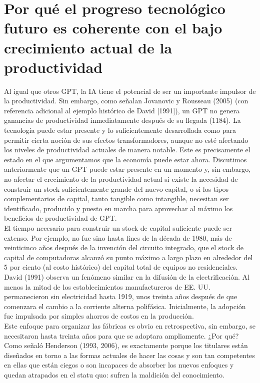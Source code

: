 \section{Por qué el progreso tecnológico futuro es coherente con el bajo crecimiento actual de la productividad}
Al igual que otros GPT, la IA tiene el potencial de ser un importante impulsor de la productividad. Sin embargo, como señalan Jovanovic y Rousseau (2005) (con referencia adicional al ejemplo histórico de David [1991]), un GPT no genera ganancias de productividad inmediatamente después de su llegada (1184). La tecnología puede estar presente y lo suficientemente desarrollada como para permitir cierta noción de sus efectos transformadores, aunque no esté afectando los niveles de productividad actuales de manera notable. Este es precisamente el estado en el que argumentamos que la economía puede estar ahora. Discutimos anteriormente que un GPT puede estar presente en un momento y, sin embargo, no afectar el crecimiento de la productividad actual si existe la necesidad de construir un stock suficientemente grande del nuevo capital, o si los tipos complementarios de capital, tanto tangible como intangible, necesitan ser identificado, producido y puesto en marcha para aprovechar al máximo los beneficios de productividad de GPT.\\
El tiempo necesario para construir un stock de capital suficiente puede ser extenso. Por ejemplo, no fue sino hasta fines de la década de 1980, más de veinticinco años después de la invención del circuito integrado, que el stock de capital de computadoras alcanzó su punto máximo a largo plazo en alrededor del 5 por ciento (al costo histórico) del capital total de equipos no residenciales.\\
David (1991) observa un fenómeno similar en la difusión de la electrificación. Al menos la mitad de los establecimientos manufactureros de EE. UU. permanecieron sin electricidad hasta 1919, unos treinta años después de que comenzara el cambio a la corriente alterna polifásica. Inicialmente, la adopción fue impulsada por simples ahorros de costos en la producción.\\
Este enfoque para organizar las fábricas es obvio en retrospectiva, sin embargo, se necesitaron hasta treinta años para que se adoptara ampliamente. ¿Por qué? Como señaló Henderson (1993, 2006), es exactamente porque los titulares están diseñados en torno a las formas actuales de hacer las cosas y son tan competentes en ellas que están ciegos o son incapaces de absorber los nuevos enfoques y quedan atrapados en el statu quo: sufren la maldición del conocimiento. \\
